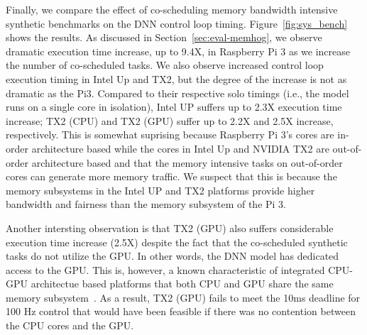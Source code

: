Finally, we compare the effect of co-scheduling memory bandwidth
intensive synthetic benchmarks on the DNN control loop timing. 
Figure~\ref{fig:sys_bench} shows the results.
As discussed in 
Section~\ref{sec:eval-memhog}, we observe dramatic execution time
increase, up to 9.4X, in Raspberry Pi 3 as we increase the number of
co-scheduled tasks. We also observe increased control loop execution
timing in Intel Up and TX2, but the degree of the increase is not as
dramatic as the Pi3. Compared to their respective solo timings (i.e.,
the model runs on a single core in isolation), Intel UP suffers up to
2.3X execution time increase; TX2 (CPU) and TX2 (GPU) suffer up to
2.2X and 2.5X increase, respectively. This is somewhat suprising
because Raspberry Pi 3's cores are in-order architecture based while
the cores in Intel Up and NVIDIA TX2 are out-of-order architecture
based and that the memory intensive tasks on out-of-order cores can
generate more memory traffic. We suspect that this is because the
memory subsystems in the Intel UP and TX2 platforms provide higher
bandwidth and fairness than the memory subsystem of the Pi 3.

Another intersting observation is that TX2 (GPU) also suffers
considerable execution time increase (2.5X) despite the fact that the
co-scheduled synthetic tasks do not utilize the GPU. In other words,
the DNN model has dedicated access to the GPU. This is, however, a
known characteristic of integrated CPU-GPU architectue based
platforms that both CPU and GPU share the same memory
subsystem~\cite{Ali2017}. As a result, TX2 (GPU) fails to meet the
10ms deadline for 100 Hz control that would have been feasible if
there was no contention between the CPU cores and the GPU.


